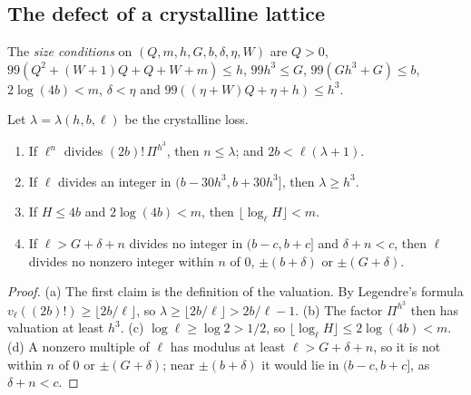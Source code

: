 \subsection{The defect of a crystalline lattice}\label{ss:defect-crystalline}
The \emph{size conditions} on $(Q,m,h,G,b,\delta,\eta,W)$ are $Q>0$, $99(Q^2+(W+1)Q+Q+W+m)\le h$, $99h^3\le G$, $99(Gh^3+G)\le b$, $2\log(4b)<m$,
$\delta<\eta$ and $99((\eta+W)Q+\eta+h)\le h^3$.

\begin{lemma}\label{lem:crystalline-loss}
Let $\lambda=\lambda(h,b,\ell)$ be the crystalline loss.
\begin{enumerate}[label=\textup{(\alph*)}]
\item If $\ell^n$ divides $(2b)!\,\Pi^{h^3}$, then $n\le\lambda$; and $2b<\ell(\lambda+1)$.
\item If $\ell$ divides an integer in $(b-30h^3,b+30h^3]$, then $\lambda\ge h^3$.
\item If $H\le4b$ and $2\log(4b)<m$, then $\lfloor\log_\ell H\rfloor<m$.
\item If $\ell>G+\delta+n$ divides no integer in $(b-c,b+c]$ and $\delta+n<c$, then $\ell$ divides no nonzero integer within $n$ of $0$, $\pm(b+\delta)$ or $\pm(G+\delta)$.
\end{enumerate}
\end{lemma}

\begin{proof}
(a) The first claim is the definition of the valuation. By Legendre's formula $v_\ell((2b)!)\ge\lfloor2b/\ell\rfloor$, so $\lambda\ge\lfloor2b/\ell\rfloor>2b/\ell-1$. (b) The factor $\Pi^{h^3}$ then has valuation at least $h^3$. (c) $\log\ell\ge\log2>1/2$, so
$\lfloor\log_\ell H\rfloor\le2\log(4b)<m$. (d) A nonzero multiple of $\ell$ has modulus at least $\ell>G+\delta+n$, so it is not within $n$ of $0$ or $\pm(G+\delta)$; near $\pm(b+\delta)$ it would lie in $(b-c,b+c]$, as $\delta+n<c$.
\end{proof}


